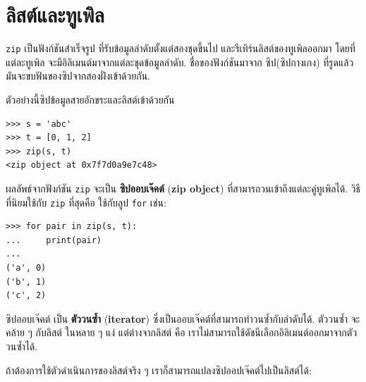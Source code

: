 \section{ลิสต์และทูเพิล}

%
\texttt{zip} เป็นฟังก์ชันสำเร็จรูป ที่รับข้อมูลลำดับตั้งแต่สองชุดขึ้นไป
และรีเทิร์นลิสต์ของทูเพิลออกมา
โดยที่ แต่ละทูเพิล จะมีอิลิเมนต์มาจากแต่ละชุดข้อมูลลำดับ.
ชื่อของฟังก์ชันมาจาก ซิป(ซิปกางเกง) 
ที่รูดแล้ว มันจะขบฟันของซิปจากสองฝั่งเข้าด้วยกัน.

%
ตัวอย่างนี้ซิปข้อมูลสายอักขระและลิสต์เข้าด้วยกัน
\begin{verbatim}
>>> s = 'abc'
>>> t = [0, 1, 2]
>>> zip(s, t)
<zip object at 0x7f7d0a9e7c48>
\end{verbatim}
%
%
ผลลัพธ์จากฟังก์ชัน \texttt{zip} จะเป็น \textbf{ซิปออบเจ๊คต์} (\textbf{zip object})
ที่สามารถวนเข้าถึงแต่ละคู่ทูเพิลได้.
วิธีที่นิยมใช้กับ \texttt{zip} ที่สุดคือ ใช้กับลูป \texttt{for} เช่น:

\begin{verbatim}
>>> for pair in zip(s, t):
...     print(pair)
...
('a', 0)
('b', 1)
('c', 2)
\end{verbatim}
%
%
ซิปออบเจ๊คต์ เป็น \textbf{ตัววนซ้ำ} (\textbf{iterator})
ซึ่งเป็นออบเจ๊คต์ที่สามารถทำวนซ้ำกับลำดับได้.
ตัววนซ้ำ จะคล้าย ๆ กับลิสต์ ในหลาย ๆ แง่
แต่ต่างจากลิสต์ คือ เราไม่สามารถใช้ดัชนีเลือกอิลิเมนต์ออกมาจากตัววนซ้ำได้.
%


%
ถ้าต้องการใช้ตัวดำเนินการของลิสต์จริง ๆ
เราก็สามารถแปลงซิปออปเจ๊คต์ไปเป็นลิสต์ได้:

